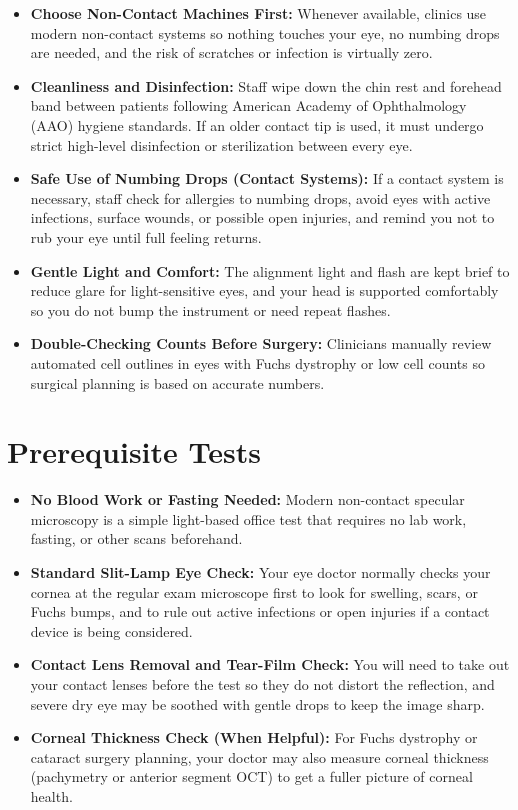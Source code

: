 \begin{itemize}
    \item \textbf{Choose Non-Contact Machines First:} Whenever available, clinics use modern non-contact systems so nothing touches your eye, no numbing drops are needed, and the risk of scratches or infection is virtually zero.
    \item \textbf{Cleanliness and Disinfection:} Staff wipe down the chin rest and forehead band between patients following American Academy of Ophthalmology (AAO) hygiene standards. If an older contact tip is used, it must undergo strict high-level disinfection or sterilization between every eye.
    \item \textbf{Safe Use of Numbing Drops (Contact Systems):} If a contact system is necessary, staff check for allergies to numbing drops, avoid eyes with active infections, surface wounds, or possible open injuries, and remind you not to rub your eye until full feeling returns.
    \item \textbf{Gentle Light and Comfort:} The alignment light and flash are kept brief to reduce glare for light-sensitive eyes, and your head is supported comfortably so you do not bump the instrument or need repeat flashes.
    \item \textbf{Double-Checking Counts Before Surgery:} Clinicians manually review automated cell outlines in eyes with Fuchs dystrophy or low cell counts so surgical planning is based on accurate numbers.
\end{itemize}

\section{Prerequisite Tests}

\begin{itemize}
    \item \textbf{No Blood Work or Fasting Needed:} Modern non-contact specular microscopy is a simple light-based office test that requires no lab work, fasting, or other scans beforehand.
    \item \textbf{Standard Slit-Lamp Eye Check:} Your eye doctor normally checks your cornea at the regular exam microscope first to look for swelling, scars, or Fuchs bumps, and to rule out active infections or open injuries if a contact device is being considered.
    \item \textbf{Contact Lens Removal and Tear-Film Check:} You will need to take out your contact lenses before the test so they do not distort the reflection, and severe dry eye may be soothed with gentle drops to keep the image sharp.
    \item \textbf{Corneal Thickness Check (When Helpful):} For Fuchs dystrophy or cataract surgery planning, your doctor may also measure corneal thickness (pachymetry or anterior segment OCT) to get a fuller picture of corneal health.
\end{itemize}

